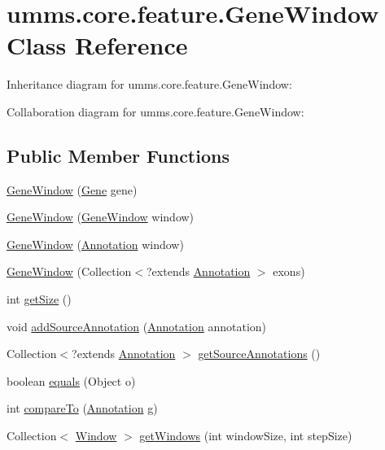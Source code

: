 \hypertarget{classumms_1_1core_1_1feature_1_1_gene_window}{\section{umms.\+core.\+feature.\+Gene\+Window Class Reference}
\label{classumms_1_1core_1_1feature_1_1_gene_window}
}


Inheritance diagram for umms.\+core.\+feature.\+Gene\+Window\+:


Collaboration diagram for umms.\+core.\+feature.\+Gene\+Window\+:
\subsection*{Public Member Functions}
\begin{DoxyCompactItemize}
\item 
\hyperlink{classumms_1_1core_1_1feature_1_1_gene_window_af3c1e96401bd9c2e0befc2ae05cd6fba}{Gene\+Window} (\hyperlink{classumms_1_1core_1_1annotation_1_1_gene}{Gene} gene)
\item 
\hyperlink{classumms_1_1core_1_1feature_1_1_gene_window_aaf5af48a96720011e917c6f3f5732508}{Gene\+Window} (\hyperlink{classumms_1_1core_1_1feature_1_1_gene_window}{Gene\+Window} window)
\item 
\hyperlink{classumms_1_1core_1_1feature_1_1_gene_window_a217e6810234cf4caf9c754fcd6c557b3}{Gene\+Window} (\hyperlink{interfaceumms_1_1core_1_1annotation_1_1_annotation}{Annotation} window)
\item 
\hyperlink{classumms_1_1core_1_1feature_1_1_gene_window_a0498ede2ab8325675d7aef23dc7060b8}{Gene\+Window} (Collection$<$?extends \hyperlink{interfaceumms_1_1core_1_1annotation_1_1_annotation}{Annotation} $>$ exons)
\item 
int \hyperlink{classumms_1_1core_1_1feature_1_1_gene_window_a62c44cfc68a5776841b9c1405720051b}{get\+Size} ()
\item 
void \hyperlink{classumms_1_1core_1_1feature_1_1_gene_window_ad3b62a6fb13b8c40a85955fa863439a2}{add\+Source\+Annotation} (\hyperlink{interfaceumms_1_1core_1_1annotation_1_1_annotation}{Annotation} annotation)
\item 
Collection$<$?extends \hyperlink{interfaceumms_1_1core_1_1annotation_1_1_annotation}{Annotation} $>$ \hyperlink{classumms_1_1core_1_1feature_1_1_gene_window_a5cd5f91c2e7e2eaf0a4783d5a3746a01}{get\+Source\+Annotations} ()
\item 
boolean \hyperlink{classumms_1_1core_1_1feature_1_1_gene_window_a83713ad9cc6b869b175ee82206c0fa4f}{equals} (Object o)
\item 
int \hyperlink{classumms_1_1core_1_1feature_1_1_gene_window_adb96ff8b83b9d068e49a93c5b2e52669}{compare\+To} (\hyperlink{interfaceumms_1_1core_1_1annotation_1_1_annotation}{Annotation} g)
\item 
Collection$<$ \hyperlink{interfaceumms_1_1core_1_1feature_1_1_window}{Window} $>$ \hyperlink{classumms_1_1core_1_1feature_1_1_gene_window_af40fab362891f30799d0680beea273c1}{get\+Windows} (int window\+Size, int step\+Size)
\end{DoxyCompactItemize}
